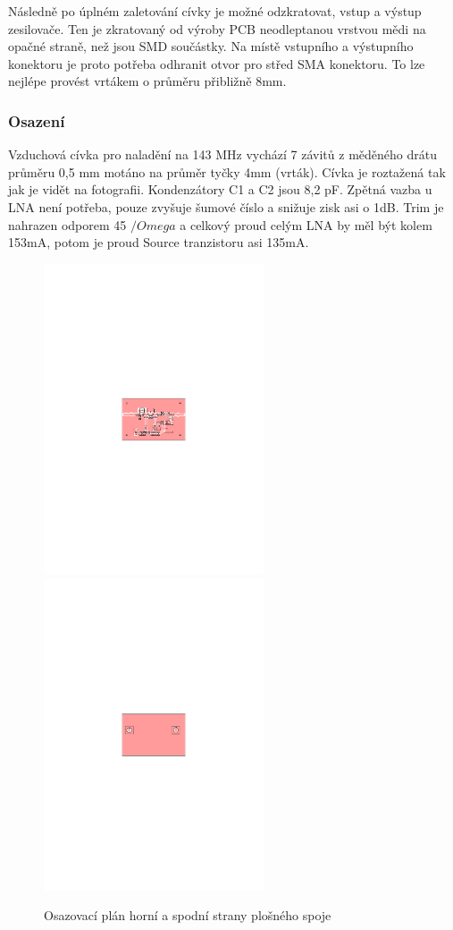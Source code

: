 \documentclass[12pt,a4paper,oneside]{article}
\begin{document}
Následně po úplném zaletování cívky je možné odzkratovat, vstup a výstup zesilovače. Ten je zkratovaný od výroby PCB neodleptanou vrstvou mědi na opačné straně, než jsou SMD součástky. Na místě vstupního a výstupního konektoru je proto potřeba odhranit otvor pro střed SMA konektoru. To lze nejlépe provést vrtákem o průměru přibližně 8mm. 

\subsubsection{Osazení}

Vzduchová cívka pro naladění na 143 MHz vychází 7 závitů z měděného drátu průměru 0,5 mm motáno na průměr tyčky 4mm (vrták). Cívka je roztažená tak jak je vidět na fotografii. Kondenzátory C1 a C2 jsou 8,2 pF. Zpětná vazba u LNA není potřeba, pouze zvyšuje šumové číslo a snižuje zisk asi o 1dB. Trim je nahrazen odporem 45 $/Omega$ a celkový proud celým LNA by měl být kolem 153mA, potom je proud Source tranzistoru asi 135mA. 

\newpage


\begin{figure} [h!tbp]
  \centering
  \includegraphics[trim = 7.3cm 12.7cm 7.3cm 12.7cm, clip, width=6.5cm]{../../hw/cam_doc/O1.pdf}
  \includegraphics[trim = 7.3cm 12.7cm 7.3cm 12.7cm, clip, width=6.5cm]{../../hw/cam_doc/O2.pdf}
  \caption{Osazovací plán horní a spodní strany plošného spoje}
  \label{fig:osazovaci_plan}
\end{figure}
\end{document}
